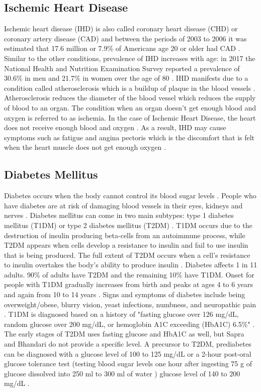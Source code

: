 \subsection{Ischemic Heart Disease}
Ischemic heart disease (IHD) is also called coronary heart disease (CHD) or coronary artery disease (CAD) \cite{criteria_ischemic_2010} and between the periods of 2003 to 2006 it was estimated that 17.6 million or 7.9\% of Americans age 20 or older had CAD \cite{criteria_ischemic_2010}. Similar to the other conditions, prevalence of IHD increases with age: in 2017 the National Health and Nutrition Examination Survey reported a prevalence of 30.6\% in men and 21.7\% in women over the age of 80 \cite{madhavan_coronary_2018}. IHD manifests due to a condition called atherosclerosis which is a buildup of plaque in the blood vessels \cite{criteria_ischemic_2010}. Atherosclerosis reduces the diameter of the blood vessel which reduces the supply of blood to an organ. The condition when an organ doesn't get enough blood and oxygen is referred to as ischemia. In the case of Ischemic Heart Disease, the heart does not receive enough blood and oxygen \cite{criteria_ischemic_2010}. As a result, IHD may cause symptoms such as fatigue and angina pectoris which is the discomfort that is felt when the heart muscle does not get enough oxygen \cite{criteria_ischemic_2010}.

\subsection{Diabetes Mellitus}
Diabetes occurs when the body cannot control its blood sugar levels \cite{sapra_diabetes_2021}. People who have diabetes are at risk of damaging blood vessels in their eyes, kidneys and nerves \cite{sapra_diabetes_2021}. Diabetes mellitus can come in two main subtypes: type 1 diabetes mellitus (T1DM) or type 2 diabetes mellitus (T2DM) \cite{sapra_diabetes_2021}. T1DM occurs due to the destruction of insulin producing beta-cells from an autoimmune process, while T2DM appears when cells develop a resistance to insulin and fail to use insulin that is being produced. The full extent of T2DM occurs when a cell’s resistance to insulin overtakes the body’s ability to produce insulin \cite{sapra_diabetes_2021}. Diabetes affects 1 in 11 adults. 90\% of adults have T2DM and the remaining 10\% have T1DM. Onset for people with T1DM gradually increases from birth and peaks at ages 4 to 6 years and again from 10 to 14 years \cite{sapra_diabetes_2021}. 
Signs and symptoms of diabetes include being overweight/obese, blurry vision, yeast infections, numbness, and neuropathic pain \cite{sapra_diabetes_2021}. T1DM is diagnosed based on a history of "fasting glucose over 126 mg/dL, random glucose over 200 mg/dL, or hemoglobin A1C exceeding (HbA1C) 6.5\%" \cite{sapra_diabetes_2021}. The early stages of T2DM uses fasting glucose and HbA1C as well, but Sapra and Bhandari do not provide a specific level. A precursor to T2DM, prediabetes can be diagnosed with a glucose level of 100 to 125 mg/dL or a 2-hour post-oral glucose tolerance test (testing blood sugar levels one hour after ingesting 75 g of glucose dissolved into 250 ml to 300 ml of water \cite{noauthor_glucose_2020}) glucose level of 140 to 200 mg/dL \cite{sapra_diabetes_2021}. 


